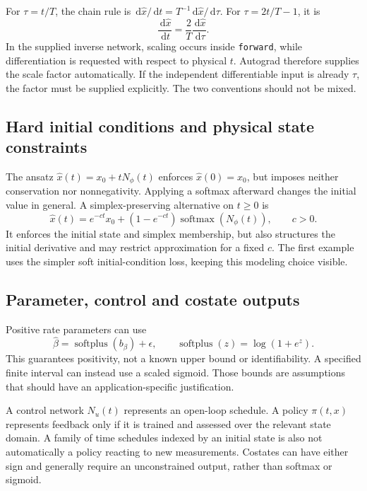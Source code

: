 \documentclass[11pt,a4paper]{article}
\newcommand{\dd}{\,\mathrm{d}}
\theoremstyle{definition}
\theoremstyle{remark}
\begin{document}
For $\tau=t/T$, the chain rule is
$\dd\hat x/\dd t=T^{-1}\dd\hat x/\dd\tau$.
For $\tau=2t/T-1$, it is
\begin{equation}
\frac{\dd\hat x}{\dd t}=\frac{2}{T}\frac{\dd\hat x}{\dd\tau}.
\label{eq:time-scale}
\end{equation}
In the supplied inverse network, scaling occurs inside \texttt{forward}, while differentiation is requested with respect to physical $t$. Autograd therefore supplies the scale factor automatically. If the independent differentiable input is already $\tau$, the factor must be supplied explicitly. The two conventions should not be mixed.

\subsection{Hard initial conditions and physical state constraints}
The ansatz $\hat x(t)=x_0+tN_\phi(t)$ enforces $\hat x(0)=x_0$, but imposes neither conservation nor nonnegativity. Applying a softmax afterward changes the initial value in general. A simplex-preserving alternative on $t\ge0$ is
\begin{equation}
\hat x(t)=e^{-ct}x_0+(1-e^{-ct})\operatorname{softmax}(N_\phi(t)),\qquad c>0.
\end{equation}
It enforces the initial state and simplex membership, but also structures the initial derivative and may restrict approximation for a fixed $c$. The first example uses the simpler soft initial-condition loss, keeping this modeling choice visible.

\subsection{Parameter, control and costate outputs}
Positive rate parameters can use
\begin{equation}
\hat\beta=\operatorname{softplus}(b_\beta)+\epsilon,
\qquad \operatorname{softplus}(z)=\log(1+e^z).
\end{equation}
This guarantees positivity, not a known upper bound or identifiability. A specified finite interval can instead use a scaled sigmoid. Those bounds are assumptions that should have an application-specific justification.

A control network $N_u(t)$ represents an open-loop schedule. A policy $\pi(t,x)$ represents feedback only if it is trained and assessed over the relevant state domain. A family of time schedules indexed by an initial state is also not automatically a policy reacting to new measurements. Costates can have either sign and generally require an unconstrained output, rather than softmax or sigmoid.
\end{document}
